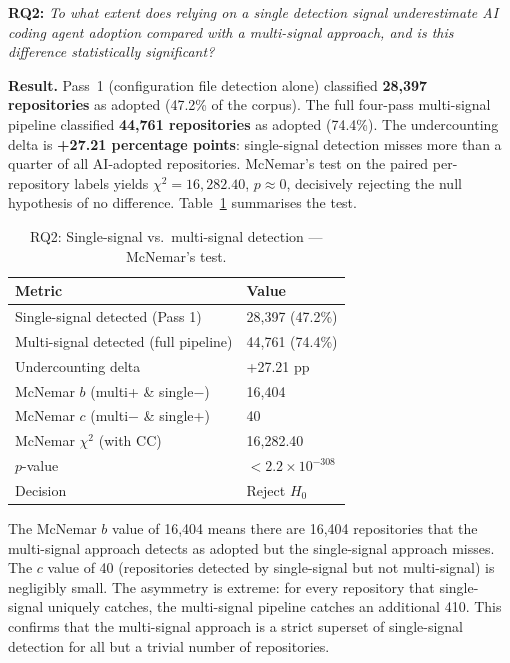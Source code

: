 \textbf{RQ2:} \textit{To what extent does relying on a single detection signal underestimate AI coding agent adoption compared with a multi-signal approach, and is this difference statistically significant?}

\textbf{Result.} Pass~1 (configuration file detection alone) classified \textbf{28,397 repositories} as adopted (47.2\% of the corpus). The full four-pass multi-signal pipeline classified \textbf{44,761 repositories} as adopted (74.4\%). The undercounting delta is \textbf{+27.21 percentage points}: single-signal detection misses more than a quarter of all AI-adopted repositories. McNemar's test on the paired per-repository labels yields $\chi^2 = 16{,}282.40$, $p \approx 0$, decisively rejecting the null hypothesis of no difference. Table~\ref{tab:rq2} summarises the test.

\begin{table}[h]
\centering
\caption{RQ2: Single-signal vs.\ multi-signal detection --- McNemar's test.}
\label{tab:rq2}
\begin{tabular}{@{}ll@{}}
\toprule
Metric & Value \\
\midrule
Single-signal detected (Pass 1)       & 28,397 (47.2\%) \\
Multi-signal detected (full pipeline) & 44,761 (74.4\%) \\
Undercounting delta                   & +27.21 pp \\
McNemar $b$ (multi+ \& single$-$)    & 16,404 \\
McNemar $c$ (multi$-$ \& single+)    & 40 \\
McNemar $\chi^2$ (with CC)           & 16,282.40 \\
$p$-value                            & $<2.2 \times 10^{-308}$ \\
Decision                             & Reject $H_0$ \\
\bottomrule
\end{tabular}
\end{table}

The McNemar $b$ value of 16,404 means there are 16,404 repositories that the multi-signal approach detects as adopted but the single-signal approach misses. The $c$ value of 40 (repositories detected by single-signal but not multi-signal) is negligibly small. The asymmetry is extreme: for every repository that single-signal uniquely catches, the multi-signal pipeline catches an additional 410. This confirms that the multi-signal approach is a strict superset of single-signal detection for all but a trivial number of repositories.

